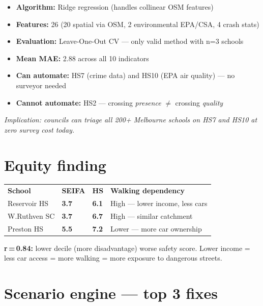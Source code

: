 \documentclass[9pt,a4paper]{extarticle}
\newcommand{\kw}[1]{\textbf{\color{DG}#1}}
\newcommand{\good}[1]{\textbf{\color{MG}#1}}
\newcommand{\warn}[1]{\textbf{\color{AMB}#1}}
\newcommand{\bad}[1]{\textbf{\color{RED}#1}}
\begin{document}
\begin{multicols}{2}
\begin{itemize}
  \item \kw{Algorithm:} Ridge regression (handles collinear OSM features)
  \item \kw{Features:} 26 (20 spatial via OSM, 2 environmental EPA/CSA, 4 crash stats)
  \item \kw{Evaluation:} Leave-One-Out CV --- only valid method with n=3 schools
  \item \kw{Mean MAE:} 2.88 across all 10 indicators
  \item \good{Can automate:} HS7 (crime data) and HS10 (EPA air quality) --- no surveyor needed
  \item \bad{Cannot automate:} HS2 --- crossing \emph{presence} $\neq$ crossing \emph{quality}
\end{itemize}
\vspace{2pt}
\textit{\small Implication: councils can triage all 200+ Melbourne schools on HS7 and HS10 at zero survey cost today.}

\section{Equity finding}

\begin{tabular}{@{}L{2.2cm} C{0.8cm} C{0.7cm} L{3.2cm}@{}}
\color{white}\tiny\textbf{School} &
\color{white}\tiny\textbf{SEIFA} &
\color{white}\tiny\textbf{HS} &
\color{white}\tiny\textbf{Walking dependency} \\
Reservoir HS   & \bad{3.7}  & \warn{6.1} & High --- lower income, less cars \\
W.Ruthven SC   & \warn{3.7} & \warn{6.7} & High --- similar catchment \\
Preston HS     & \good{5.5} & \good{7.2} & Lower --- more car ownership \\
\end{tabular}

\vspace{2pt}
\kw{r\,=\,0.84:} lower decile (more disadvantage) \textrightarrow{} worse safety score.
Lower income = less car access = more walking = more exposure to dangerous streets.

\section{Scenario engine --- top 3 fixes}


\end{multicols}
\end{document}
